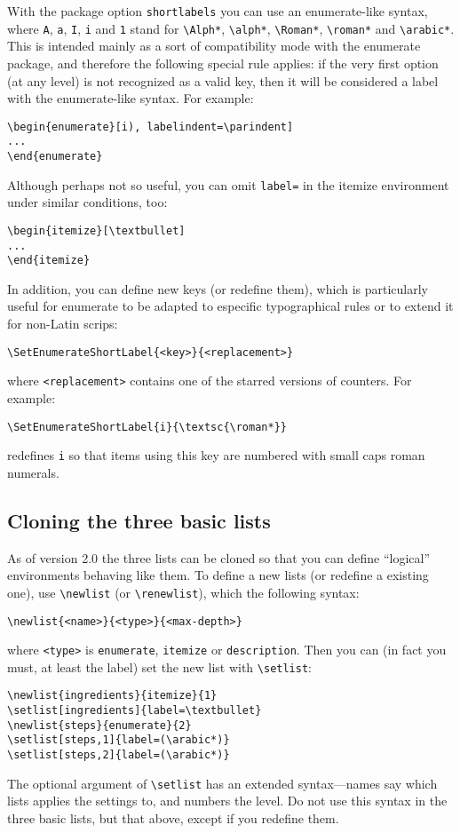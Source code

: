 \documentclass{article}
\begin{document}
With the package option \texttt{shortlabels} you can use an
\textsf{enumerate}-like syntax, where \verb|A|, \verb|a|, \verb|I|,
\verb|i| and \verb|1| stand for \verb|\Alph*|, \verb|\alph*|,
\verb|\Roman*|, \verb|\roman*| and \verb|\arabic*|.  This is intended
mainly as a sort of compatibility mode with the \textsf{enumerate}
package, and therefore the following special rule applies: if the very
first option (at any level) is not recognized as a valid key, then it
will be considered a label with the \textsf{enumerate}-like syntax.  For
example:
\begin{verbatim}
\begin{enumerate}[i), labelindent=\parindent]
...
\end{enumerate}
\end{verbatim}
Although perhaps not so useful, you can omit \verb|label=| in the
itemize environment under similar conditions, too:
\begin{verbatim}
\begin{itemize}[\textbullet]
...
\end{itemize}
\end{verbatim}

In addition, you can define new keys (or redefine them), which is
particularly useful for enumerate to be adapted to especific
typographical rules or to extend it for non-Latin scrips:
\begin{verbatim}
\SetEnumerateShortLabel{<key>}{<replacement>}
\end{verbatim}
where \verb|<replacement>| contains one of the starred versions of 
counters. For example:
\begin{verbatim}
\SetEnumerateShortLabel{i}{\textsc{\roman*}}
\end{verbatim}
redefines \verb|i| so that items using this key are numbered with
small caps roman numerals.

\subsection{Cloning the three basic lists}

As of version 2.0 the three lists can be cloned so that you can 
define ``logical'' environments behaving like them. To define a
new lists (or redefine a existing one), use \verb|\newlist| (or 
\verb|\renewlist|), which the following syntax:
\begin{verbatim}
\newlist{<name>}{<type>}{<max-depth>}
\end{verbatim}
where \verb|<type>| is \verb|enumerate|, \verb|itemize| or 
\verb|description|. Then you can (in fact you must, at least the 
label) set the new list with \verb|\setlist|:
\begin{verbatim}
\newlist{ingredients}{itemize}{1}
\setlist[ingredients]{label=\textbullet}
\newlist{steps}{enumerate}{2}
\setlist[steps,1]{label=(\arabic*)}
\setlist[steps,2]{label=(\arabic*)}
\end{verbatim}
The optional argument of \verb|\setlist| has an extended
syntax---names say which lists applies the settings to, and numbers
the level.  Do not use this syntax in the three basic lists, but that
above, except if you redefine them.
\end{document}

